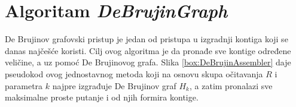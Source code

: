 \documentclass[12pt,oneside]{memoir}
\begin{document}


\begin{comment}
Na slici \ref{fig:5}(c) se može videti primer koji ilustruje izvršavanje algoritma DSK. Neka je $n_{list} = 2$, $n_{sublist} = 2$ and $h(z) = b(z)$ za svaki $z \in Z$. Kako je $n_{list} = 2$, algoritam izvršava 2 iteracije (u nastavku sledi opis nulte iteracije, jer se prva izvršava slično). Prva faza nulte iteracije skenira sve k-mere iz $Z$ i identifikuje svaki k-mer $z \in Z$ koji pripada nultoj listi. Na primer, $h(GG) = 10$, kako je $h(GG)$ \textit{mod} $n_{list} = 0$ i $\frac{h(z)}{n_{list}}$ \textit{mod} $n_{sublist} = 1$, $GG$ pripada nultoj listi i prvoj podlisti. Nakon toga, nulta lista se deli na nultu podlistu $\{CA\}$ i prvu podlistu $\{CG, GG\}$. Obe podliste su zapisane na disku. Druga faza čita svaku podlistu iz memorije i broji k-mere koristeći $JellyFish$ algoritam.
\end{comment}


\section{Algoritam \textit{DeBrujinGraph}}
\label{odeljak:ImplementacijaDB}

De Brujinov grafovski pristup je jedan od pristupa u izgradnji kontiga koji se danas najčešće koristi. Cilj ovog algoritma je da pronađe sve kontige određene veličine, a uz pomoć De Brujinovog grafa. Slika \ref{box:DeBrujinAssembler} daje pseudokod ovog jednostavnog metoda koji na osnovu skupa očitavanja $R$ i parametra $k$ najpre izgrađuje De Brujinov graf $H_k$, a zatim pronalazi sve maksimalne proste putanje i od njih formira kontige.

\begin{comment}

\begin{figure}[!ht]
\centering
\texttt{[image: Figura5\_17.PNG]}
\caption{Jednostavan De Brujinov grafovski asembler \cite{WingKinSung}}
\label{fig:11}
\end{figure}

\end{comment}
\end{document}
